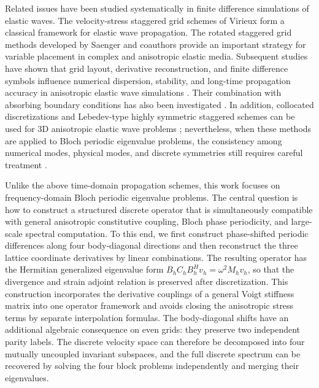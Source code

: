\documentclass[11pt,oneside]{article}
\numberwithin{equation}{section}
\theoremstyle{plain}
\theoremstyle{remark}
\begin{document}
Related issues have been studied systematically in finite difference simulations of elastic waves. The velocity-stress staggered grid schemes of Virieux \cite{Virieux1984,Virieux1986} form a classical framework for elastic wave propagation. The rotated staggered grid methods developed by Saenger and coauthors \cite{Saenger2000,Saenger2004,BansalSen2008} provide an important strategy for variable placement in complex and anisotropic elastic media. Subsequent studies have shown that grid layout, derivative reconstruction, and finite difference symbols influence numerical dispersion, stability, and long-time propagation accuracy in anisotropic elastic wave simulations \cite{Bernth2011,Yang2015,Gao2017}. Their combination with absorbing boundary conditions has also been investigated \cite{Chen2006}. In addition, collocated discretizations and Lebedev-type highly symmetric staggered schemes can be used for 3D anisotropic elastic wave problems \cite{Zhang2012,Lisitsa2010}; nevertheless, when these methods are applied to Bloch periodic eigenvalue problems, the consistency among numerical modes, physical modes, and discrete symmetries still requires careful treatment \cite{Koene2021}.

Unlike the above time-domain propagation schemes, this work focuses on frequency-domain Bloch periodic eigenvalue problems. The central question is how to construct a structured discrete operator that is simultaneously compatible with general anisotropic constitutive coupling, Bloch phase periodicity, and large-scale spectral computation. To this end, we first construct phase-shifted periodic differences along four body-diagonal directions and then reconstruct the three lattice coordinate derivatives by linear combinations. The resulting operator has the Hermitian generalized eigenvalue form \(B_hC_hB_h^H v_h=\omega^2M_hv_h\), so that the divergence and strain adjoint relation is preserved after discretization. This construction incorporates the derivative couplings of a general Voigt stiffness matrix into one operator framework and avoids closing the anisotropic stress terms by separate interpolation formulas. The body-diagonal shifts have an additional algebraic consequence on even grids: they preserve two independent parity labels. The discrete velocity space can therefore be decomposed into four mutually uncoupled invariant subspaces, and the full discrete spectrum can be recovered by solving the four block problems independently and merging their eigenvalues.
\end{document}
